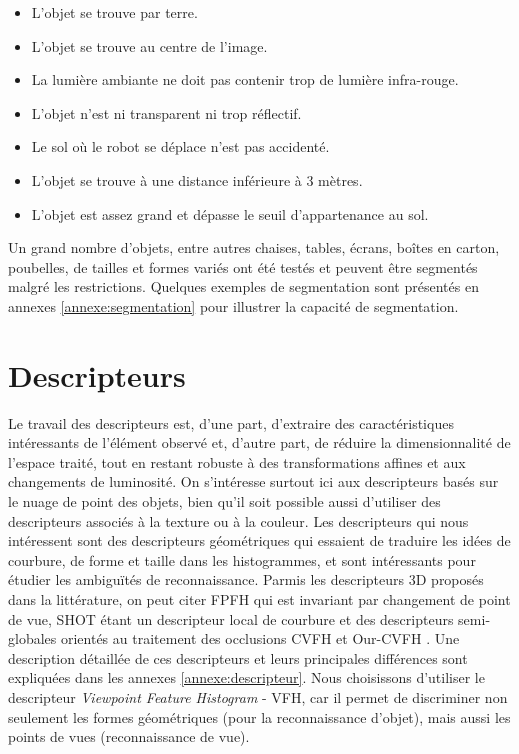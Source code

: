 \begin{itemize}
\item L'objet se trouve par terre.
\item L'objet se trouve au centre de l'image.
\item La lumière ambiante ne doit pas contenir trop de lumière infra-rouge.
\item L'objet n'est ni transparent ni trop réflectif.
\item Le sol où le robot se déplace n'est pas accidenté.
\item L'objet se trouve à une distance inférieure à 3 mètres.
\item L'objet est assez grand et dépasse le seuil d'appartenance au sol.

\end{itemize} 

Un grand nombre d'objets, entre autres chaises, tables, écrans, boîtes en carton, poubelles, de tailles et formes variés ont été testés et peuvent être segmentés malgré les restrictions. Quelques exemples de segmentation sont présentés en annexes \ref{annexe:segmentation} pour illustrer la capacité de segmentation. 

\section{Descripteurs}

Le travail des descripteurs est, d'une part, d'extraire des caractéristiques intéressants de l'élément observé et, d'autre part, de réduire la
dimensionnalité de l'espace traité, tout en restant robuste à des transformations affines et aux changements de luminosité. On s'intéresse surtout ici aux descripteurs basés sur le nuage de point des objets, bien qu'il soit possible aussi d'utiliser des descripteurs associés à la texture ou à la couleur. Les descripteurs qui nous intéressent sont des descripteurs géométriques qui essaient de traduire les idées de courbure, de forme et taille dans les histogrammes, et sont intéressants pour étudier les ambiguïtés de reconnaissance. Parmis les descripteurs 3D proposés dans la littérature, on peut citer FPFH \cite{rusu2009fast} qui est invariant par changement de point de vue, SHOT \cite{tombari2010unique} étant un descripteur local de courbure et des descripteurs semi-globales orientés au traitement des occlusions CVFH \cite{aldoma2011cad} et Our-CVFH \cite{aldoma2012our}. Une description détaillée de ces descripteurs et leurs principales différences sont expliquées dans les annexes \ref{annexe:descripteur}. Nous choisissons d'utiliser le descripteur \textit{Viewpoint Feature Histogram} - VFH, car il permet de discriminer non seulement les formes géométriques (pour la reconnaissance d'objet), mais aussi les points de vues (reconnaissance de vue).

